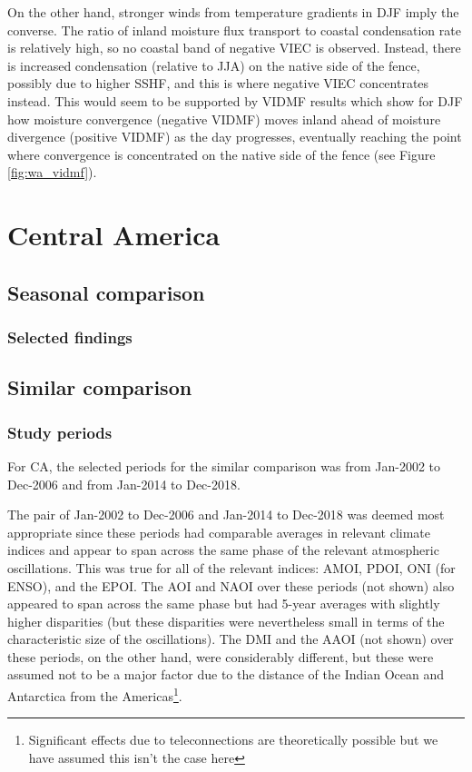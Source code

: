 On the other hand, stronger winds from temperature gradients in \ac{DJF} imply the converse. The ratio of inland moisture flux transport to coastal condensation rate is relatively high, so no coastal band of negative \ac{VIEC} is observed. Instead, there is increased condensation (relative to \ac{JJA}) on the native side of the fence, possibly due to higher \ac{SSHF}, and this is where negative \ac{VIEC} concentrates instead. This would seem to be supported by \ac{VIDMF} results which show for \ac{DJF} how moisture convergence (negative \ac{VIDMF}) moves inland ahead of moisture divergence (positive \ac{VIDMF}) as the day progresses, eventually reaching the point where convergence is concentrated on the native side of the fence (see Figure \ref{fig:wa_vidmf}).

\section{Central America}

\subsection{Seasonal comparison}

\subsubsection{Selected findings}

\subsection{Similar comparison}

\subsubsection{Study periods}
\label{sssec:period_seas_ca}

For \ac{CA}, the selected periods for the similar comparison was from Jan-2002 to Dec-2006 and from Jan-2014 to Dec-2018.

The pair of Jan-2002 to Dec-2006 and Jan-2014 to Dec-2018 was deemed most appropriate since these periods had comparable averages in relevant climate indices and appear to span across the same phase of the relevant atmospheric oscillations. This was true for all of the relevant indices: \ac{AMOI}, \ac{PDOI}, \ac{ONI} (for \ac{ENSO}), and the \ac{EPOI}. The \ac{AOI} and \ac{NAOI} over these periods (not shown) also appeared to span across the same phase but had 5-year averages with slightly higher disparities (but these disparities were nevertheless small in terms of the characteristic size of the oscillations). The \ac{DMI} and the \ac{AAOI} (not shown) over these periods, on the other hand, were considerably different, but these were assumed not to be a major factor due to the distance of the Indian Ocean and Antarctica from the Americas\footnote{Significant effects due to teleconnections are theoretically possible but we have assumed this isn't the case here}.

